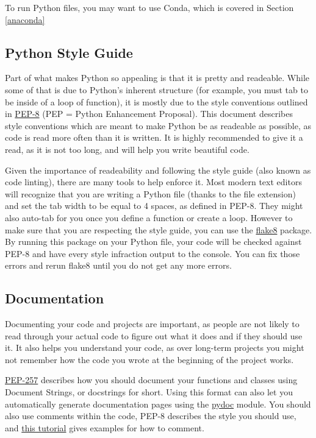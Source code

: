 \documentclass[letterpaper, 12pt]{article}
\begin{document}
To run Python files, you may want to use Conda, which is covered in Section \ref{anaconda}


\subsection{Python Style Guide}
Part of what makes Python so appealing is that it is pretty and readeable. While some of that is due to Python's inherent structure (for example, you must tab to be inside of a loop of function), it is mostly due to the style conventions outlined in \href{https://www.python.org/dev/peps/pep-0008/}{PEP-8} (PEP = Python Enhancement Proposal). This document describes style conventions which are meant to make Python be as readeable as possible, as code is read more often than it is written. It is highly recommended to give it a read, as it is not too long, and will help you write beautiful code.

Given the importance of readeability and following the style guide (also known as code linting), there are many tools to help enforce it. Most modern text editors will recognize that you are writing a Python file (thanks to the file extension) and set the tab width to be equal to 4 spaces, as defined in PEP-8. They might also auto-tab for you once you define a function or create a loop. However to make sure that you are respecting the style guide, you can use the \href{https://flake8.pycqa.org/en/latest/}{flake8} package. By running this package on your Python file, your code will be checked against PEP-8 and have every style infraction output to the console. You can fix those errors and rerun flake8 until you do not get any more errors.

\subsection{Documentation}
Documenting your code and projects are important, as people are not likely to read through your actual code to figure out what it does and if they should use it. It also helps you understand your code, as over long-term projects you might not remember how the code you wrote at the beginning of the project works. 

\href{https://www.python.org/dev/peps/pep-0257/}{PEP-257} describes how you should document your functions and classes using Document Strings, or docstrings for short. Using this format can also let you automatically generate documentation pages using the \href{https://docs.python.org/3/library/pydoc.html}{pydoc} module. You should also use comments within the code, PEP-8 describes the style you should use, and \href{https://python-102.readthedocs.io/en/latest/documenting.html}{this tutorial} gives examples for how to comment.
\end{document}
